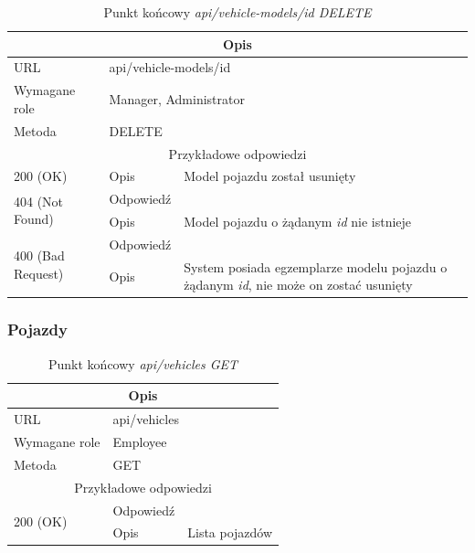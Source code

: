 \documentclass[eng,printmode,openany]{mgr}
\begin{document}
\begin{table}[H]
	\caption{Punkt końcowy \textit{api/vehicle-models/id DELETE}}
	\begin{tabularx}{\textwidth}{|l|l|X|}
		\hline
		\multicolumn{3}{|c|}{Opis}                         						\\ \hline
		URL                       & \multicolumn{2}{l|}{api/vehicle-models/id} 	\\ \hline
		Wymagane role             & \multicolumn{2}{l|}{Manager, Administrator} \\ \hline
		Metoda                    & \multicolumn{2}{l|}{DELETE} 				\\ \hline
		\multicolumn{3}{|c|}{ Przykładowe odpowiedzi}                   		\\ \hline
		200 (OK)			& Opis         	& Model pojazdu został usunięty		\\ \hline
		\multirow{2}{*}{404 (Not Found)} 	& Odpowiedź     &     	\\ \cline{2-3} 
		& Opis          & Model pojazdu o żądanym \textit{id} nie istnieje  											\\ \hline
		\multirow{2}{*}{400 (Bad Request)} 	& Odpowiedź     &     	\\ \cline{2-3} 
		& Opis          & System posiada egzemplarze modelu pojazdu o żądanym \textit{id}, nie może on zostać usunięty 	\\ \hline
	\end{tabularx}
\end{table}

\subsubsection{Pojazdy}
\begin{table}[H]
	\caption{Punkt końcowy \textit{api/vehicles GET}}
	\begin{tabularx}{\textwidth}{|l|l|X|}
		\hline
		\multicolumn{3}{|c|}{Opis}                         						\\ \hline
		URL                       & \multicolumn{2}{l|}{api/vehicles} 			\\ \hline
		Wymagane role             & \multicolumn{2}{l|}{Employee} 				\\ \hline
		Metoda                    & \multicolumn{2}{l|}{GET} 					\\ \hline
		\multicolumn{3}{|c|}{ Przykładowe odpowiedzi}                   		\\ \hline
		\multirow{2}{*}{200 (OK)} 			& Odpowiedź     &        	\\ \cline{2-3} 
		& Opis         	& Lista pojazdów       												\\ \hline
	\end{tabularx}
\end{table}
\end{document}
